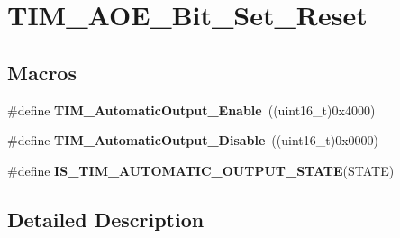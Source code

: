 \hypertarget{group___t_i_m___a_o_e___bit___set___reset}{\section{T\-I\-M\-\_\-\-A\-O\-E\-\_\-\-Bit\-\_\-\-Set\-\_\-\-Reset}
\label{group___t_i_m___a_o_e___bit___set___reset}
}
\subsection*{Macros}
\begin{DoxyCompactItemize}
\item 
\hypertarget{group___t_i_m___a_o_e___bit___set___reset_gaa416873d01fe62fe8d3f9c8bb7853fa1}{\#define {\bfseries T\-I\-M\-\_\-\-Automatic\-Output\-\_\-\-Enable}~((uint16\-\_\-t)0x4000)}\label{group___t_i_m___a_o_e___bit___set___reset_gaa416873d01fe62fe8d3f9c8bb7853fa1}

\item 
\hypertarget{group___t_i_m___a_o_e___bit___set___reset_ga0f80ba4fbadd434bc82ca63e904ace41}{\#define {\bfseries T\-I\-M\-\_\-\-Automatic\-Output\-\_\-\-Disable}~((uint16\-\_\-t)0x0000)}\label{group___t_i_m___a_o_e___bit___set___reset_ga0f80ba4fbadd434bc82ca63e904ace41}

\item 
\#define {\bfseries I\-S\-\_\-\-T\-I\-M\-\_\-\-A\-U\-T\-O\-M\-A\-T\-I\-C\-\_\-\-O\-U\-T\-P\-U\-T\-\_\-\-S\-T\-A\-T\-E}(S\-T\-A\-T\-E)
\end{DoxyCompactItemize}


\subsection{Detailed Description}


